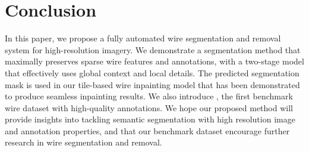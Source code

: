 \section{Conclusion}

In this paper, we propose a fully automated wire segmentation and removal system for high-resolution imagery. We demonstrate a segmentation method that maximally preserves sparse wire features and annotations, with a two-stage model that effectively uses global context and local details. The predicted segmentation mask is used in our tile-based wire inpainting model that has been demonstrated to produce seamless inpainting results.
We also introduce \benchmark, the first benchmark wire dataset with high-quality annotations. We hope our proposed method will provide insights into tackling semantic segmentation with high resolution image and annotation properties, and that our benchmark dataset encourage further research in wire segmentation and removal.

